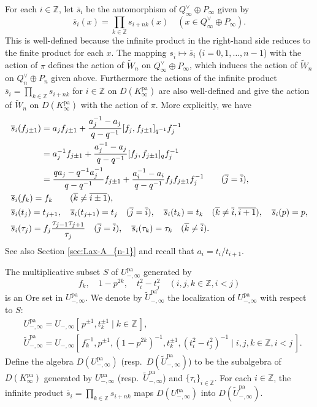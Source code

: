\documentclass[12pt,twoside]{article}
\newcommand\tU{{\widetilde U}}
\newcommand\tW{{\widetilde W}}
\newcommand\bars{{\overline s}}
\newcommand\Qv{Q^\vee}
\newcommand\pa{{\mathrm{pa}}}
\newcommand\Z{{\mathbb Z}} %
\theoremstyle{plain} %
\theoremstyle{definition} %
\theoremstyle{definition} %
\numberwithin{theorem}{section}
\numberwithin{equation}{section}
\numberwithin{figure}{section}
\numberwithin{table}{section}
\newcommand\secref[1]{Section \ref{#1}}
\begin{document}
For each $i\in\Z$, 
let $\bars_i$ be the automorphism of $\Qv_\infty\oplus P_\infty$ given by
\begin{equation*}
 \bars_i(x) = \prod_{k\in\Z} s_{i+nk}(x)
 \quad (x\in \Qv_\infty\oplus P_\infty).
\end{equation*}
This is well-defined 
because the infinite product in the right-hand side 
reduces to the finite product for each $x$.
The mapping $s_{\overline{i}}\mapsto\bars_i$ ($i=0,1,\ldots,n-1$)
with the action of $\pi$ 
defines the action of $\tW_n$ on $\Qv_\infty\oplus P_\infty$,
which induces the action of $\tW_n$ on $\Qv_n\oplus P_n$ 
given above.
%
Furthermore the actions 
of the infinite product $\bars_i=\prod_{k\in\Z}s_{i+nk}$
for $i\in\Z$ on $D(K_\infty^\pa)$ are also well-defined 
and give the action of $\tW_n$ on $D(K_\infty^\pa)$
with the action of $\pi$.
More explicitly, we have
\begin{align*}
 &
 \bars_i(f_{j\pm1}) 
 = a_j f_{j\pm1} 
 + \frac{a_j^{-1}-a_j}{q-q^{-1}}[f_j,f_{j\pm1}]_{q^{-1}} f_j^{-1}
 \\ &
 \hphantom{\bars_i(f_{j\pm1})}
 = a_j^{-1} f_{j\pm1} 
 + \frac{a_j^{-1}-a_j}{q-q^{-1}}[f_j,f_{j\pm1}]_q        f_j^{-1}
 \\ &
 \hphantom{\bars_i(f_{j\pm1})}
 = \frac{qa_j-q^{-1}a_j^{-1}}{q-q^{-1}}f_{j\pm1}
 + \frac{a_i^{-1}-a_i}{q-q^{-1}}f_j f_{j\pm1} f_j^{-1}
 \qquad (\overline{j}=\overline{i}),
 \\ &
 \bars_i(f_k) = f_k \qquad (\overline{k}\ne\overline{i\pm1}),
 \\ &
 \bars_i(t_j)=t_{j+1}, \quad
 \bars_i(t_{j+1}) = t_j 
 \quad (\overline{j}=\overline{i}), 
 \quad
 \bars_i(t_k)=t_k 
 \quad (\overline{k}\ne\overline{i},\overline{i+1}), 
 \quad
 \bars_i(p) = p, 
 \\ &
 \bars_i(\tau_j) = f_j\frac{\tau_{j-1}\tau_{j+1}}{\tau_j}
 \quad (\overline{j}=\overline{i}), 
 \quad
 \bars_i(\tau_k) = \tau_k
 \quad (\overline{k}\ne\overline{i}).
\end{align*}
See also \secref{sec:Lax-A_{n-1}} and recall that $a_i=t_i/t_{i+1}$.

The multiplicative subset $S$ of $U_{-,\infty}^\pa$ generated by
\begin{equation*}
  f_k,\quad 1-p^{2k},\quad t_i^2-t_j^2 \quad (i,j,k\in\Z, i<j)
\end{equation*}
is an Ore set in $U_{-,\infty}^\pa$. 
We denote by $\tU_{-,\infty}^\pa$ the localization of $U_{-,\infty}^\pa$
with respect to $S$:
\begin{align*}
 &
 U_{-,\infty}^\pa = U_{-,\infty}[\, p^{\pm1},t_k^{\pm1} \mid k\in\Z\,],
 \\ &
 \tU_{-,\infty}^\pa
 = U_{-,\infty}
   [\, f_k^{-1}, p^{\pm1}, (1-p^{2k})^{-1}, t_k^{\pm1}, (t_i^2-t_j^2)^{-1}
   \mid i,j,k\in\Z, i<j \,].
\end{align*} 
Define the algebra $D(U_{-,\infty}^\pa)$ (resp.\ $D(\tU_{-,\infty}^\pa)$) 
to be the subalgebra of $D(K_\infty^\pa)$ generated 
by $U_{-,\infty}^\pa$ (resp.\ $\tU_{-,\infty}^\pa$)
and $\{\tau_i\}_{i\in\Z}$.
For each $i\in\Z$, the infinite product $\bars_i=\prod_{k\in\Z}s_{i+nk}$
maps $D(U_{-,\infty}^\pa)$ into $D(\tU_{-,\infty}^\pa)$.
\end{document}
